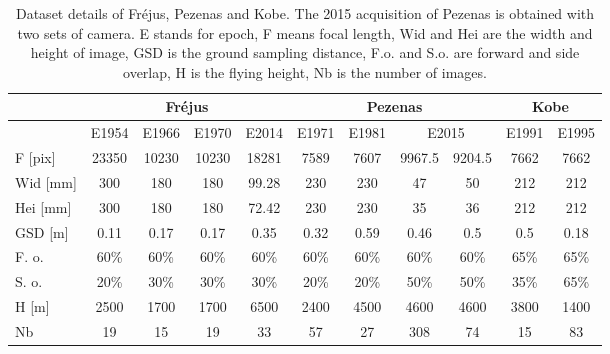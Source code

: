 \begin{table}[htbp]
    \scriptsize %
    \centering
    \begin{tabular}{||l|c|c|c|c||c|c|c|c||c|c||}\hline
        &\multicolumn{4}{c||}{Fr{\'e}jus}&\multicolumn{4}{c||}{Pezenas}&\multicolumn{2}{c||}{Kobe}\\\hline
                &E1954&E1966&E1970&E2014&E1971&E1981&\multicolumn{2}{c||}{E2015}&E1991&E1995\\\hline\hline
        F [pix]&23350&10230&10230&\color{black}18281&7589&7607&9967.5&9204.5&7662&7662\\
        Wid [mm]&300&180&180&99.28&230&230&47&50&212&212\\
        Hei [mm]&300&180&180&72.42&230&230&35&36&212&212\\
        GSD [m]&\color{black}0.11&\color{black}0.17&0.17&0.35&0.32&0.59&0.46&0.5&0.5&0.18\\
        F. o.&60\%&60\%&60\%&60\%&   60\%&60\%&60\%&60\%&   65\%&65\%\\
        S. o.&20\%&30\%&30\%&30\%&   20\%&20\%&50\%&50\%&   35\%&65\%\\
        H  [m]&2500&1700&1700&6500&2400&4500&4600&4600&3800&1400\\
        Nb &19&15&19&33&57&27&308&74&15&83\\\hline
        
        
    \end{tabular}
    \caption{Dataset details of Fr{\'e}jus, Pezenas and Kobe. The 2015 acquisition of Pezenas is obtained with two sets of camera. E stands for epoch, F means focal length, Wid and Hei are the width and height of image, GSD is the ground sampling distance, F.o. and S.o. are forward and side overlap, H is the flying height, Nb is the number of images.}
    \label{Data details}
\end{table}


